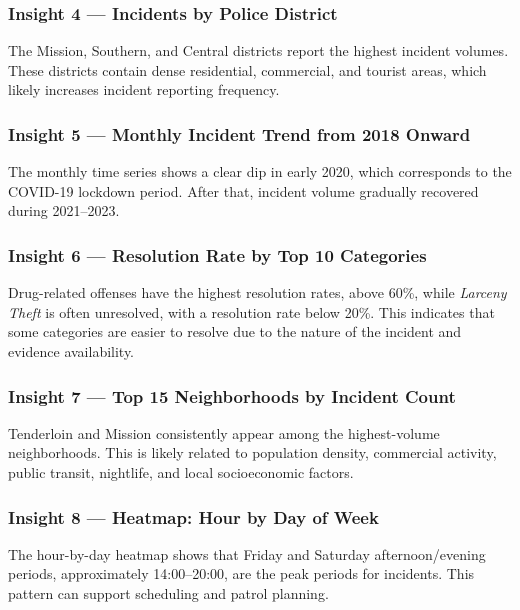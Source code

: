 \documentclass[12pt,a4paper]{article}
\begin{document}
\subsubsection{Insight 4 --- Incidents by Police District}

The Mission, Southern, and Central districts report the highest incident volumes. These districts contain dense residential, commercial, and tourist areas, which likely increases incident reporting frequency.

\subsubsection{Insight 5 --- Monthly Incident Trend from 2018 Onward}

The monthly time series shows a clear dip in early 2020, which corresponds to the COVID-19 lockdown period. After that, incident volume gradually recovered during 2021--2023.

\subsubsection{Insight 6 --- Resolution Rate by Top 10 Categories}

Drug-related offenses have the highest resolution rates, above 60\%, while \textit{Larceny Theft} is often unresolved, with a resolution rate below 20\%. This indicates that some categories are easier to resolve due to the nature of the incident and evidence availability.

\subsubsection{Insight 7 --- Top 15 Neighborhoods by Incident Count}

Tenderloin and Mission consistently appear among the highest-volume neighborhoods. This is likely related to population density, commercial activity, public transit, nightlife, and local socioeconomic factors.

\subsubsection{Insight 8 --- Heatmap: Hour by Day of Week}

The hour-by-day heatmap shows that Friday and Saturday afternoon/evening periods, approximately 14:00--20:00, are the peak periods for incidents. This pattern can support scheduling and patrol planning.
\end{document}
